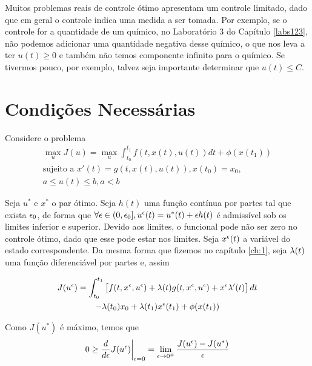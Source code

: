 Muitos problemas reais de controle ótimo apresentam um controle limitado, dado
que em geral o controle indica uma medida a ser tomada. Por exemplo, se o
controle for a quantidade de um químico, no Laboratório 3 do Capítulo
\ref{labs123}, não podemos adicionar uma quantidade negativa desse químico, o
que nos leva a ter $u(t) \ge 0$ e também não temos componente infinito para o
químico. Se tivermos pouco, por exemplo, talvez seja importante determinar que
$u(t) \le C$. 

\section{Condições Necessárias} 

Considere o problema
\begin{gather*}
    \max_u J(u) = \max_u \int_{t_0}^{t_1} f(t,x(t),u(t))dt + \phi(x(t_1)) \\
    \text{sujeito a   }x'(t) = g(t,x(t),u(t)), x(t_0) = x_0, \\
    a \leq u(t) \leq b, a < b
\end{gather*}

Seja $u^*$ e $x^*$ o par ótimo. Seja $h(t)$ uma função contínua por partes tal
que exista $\epsilon_0$, de forma que $\forall \epsilon \in (0,\epsilon_0], u^{\epsilon}(t) = u^*(t) +
\epsilon h(t)$ é admissível sob os limites inferior e superior. Devido aos limites,
o funcional pode não ser zero no controle ótimo, dado que esse pode estar nos
limites. Seja $x^{\epsilon}(t)$ a variável do estado correspondente. Da mesma forma
que fizemos no capítulo \ref{ch:1}, seja $\lambda(t)$ uma função diferenciável por
partes e, assim 

\begin{multline}
    \label{eq:8-1}
    J(u^{\epsilon}) = \int_{t_0}^{t_1} \left[f(t,x^{\epsilon}, u^{\epsilon}) + \lambda(t)g(t,x^{\epsilon}, u^{\epsilon}) + x^{\epsilon}\lambda '(t)\right]dt \\
    - \lambda(t_0)x_0 + \lambda(t_1)x^{\epsilon}(t_1) + \phi(x(t_1))
\end{multline}    

Como $J(u^*)$ é máximo, temos que 
\begin{equation}
    \label{eq:8-2}
    0 \ge \frac{d}{d\epsilon}J(u^{\epsilon})\bigg\vert_{\epsilon = 0} = \lim_{\epsilon \to 0^+} \frac{J(u^{\epsilon}) - J(u^*)}{\epsilon}
\end{equation}

